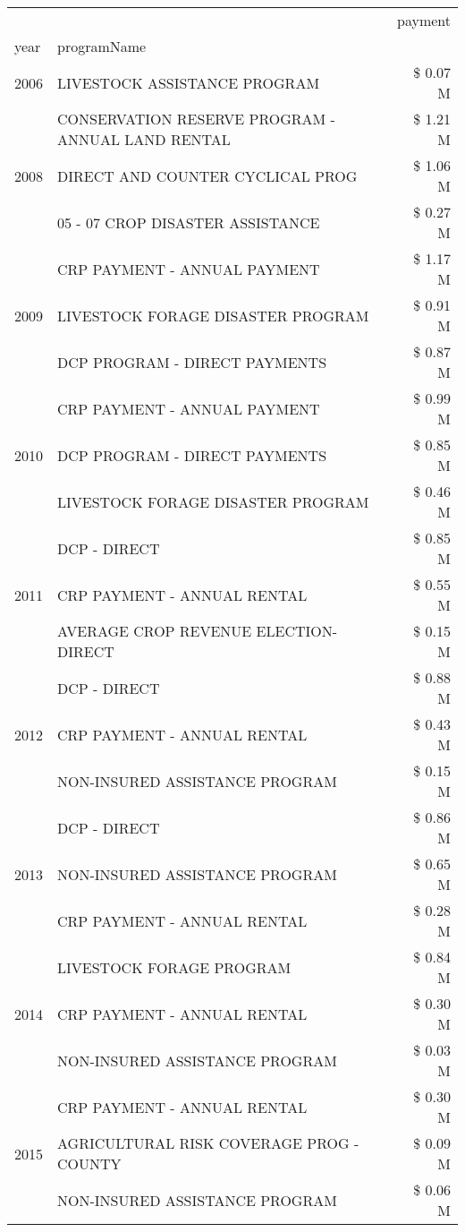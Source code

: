 \begin{tabular}{llr}
\toprule
 &  & payment \\
year & programName &  \\
\midrule
2006 & LIVESTOCK ASSISTANCE PROGRAM & \$ 0.07 M \\
\cline{1-3}
\multirow[t]{3}{*}{2008} & CONSERVATION RESERVE PROGRAM - ANNUAL LAND RENTAL & \$ 1.21 M \\
 & DIRECT AND COUNTER CYCLICAL PROG & \$ 1.06 M \\
 & 05 - 07 CROP DISASTER ASSISTANCE & \$ 0.27 M \\
\cline{1-3}
\multirow[t]{3}{*}{2009} & CRP PAYMENT - ANNUAL PAYMENT & \$ 1.17 M \\
 & LIVESTOCK FORAGE DISASTER  PROGRAM & \$ 0.91 M \\
 & DCP PROGRAM - DIRECT PAYMENTS & \$ 0.87 M \\
\cline{1-3}
\multirow[t]{3}{*}{2010} & CRP PAYMENT - ANNUAL PAYMENT & \$ 0.99 M \\
 & DCP PROGRAM - DIRECT PAYMENTS & \$ 0.85 M \\
 & LIVESTOCK FORAGE DISASTER  PROGRAM & \$ 0.46 M \\
\cline{1-3}
\multirow[t]{3}{*}{2011} & DCP - DIRECT & \$ 0.85 M \\
 & CRP PAYMENT - ANNUAL RENTAL & \$ 0.55 M \\
 & AVERAGE CROP REVENUE ELECTION-DIRECT & \$ 0.15 M \\
\cline{1-3}
\multirow[t]{3}{*}{2012} & DCP - DIRECT & \$ 0.88 M \\
 & CRP PAYMENT - ANNUAL RENTAL & \$ 0.43 M \\
 & NON-INSURED ASSISTANCE PROGRAM & \$ 0.15 M \\
\cline{1-3}
\multirow[t]{3}{*}{2013} & DCP - DIRECT & \$ 0.86 M \\
 & NON-INSURED ASSISTANCE PROGRAM & \$ 0.65 M \\
 & CRP PAYMENT - ANNUAL RENTAL & \$ 0.28 M \\
\cline{1-3}
\multirow[t]{3}{*}{2014} & LIVESTOCK FORAGE PROGRAM & \$ 0.84 M \\
 & CRP PAYMENT - ANNUAL RENTAL & \$ 0.30 M \\
 & NON-INSURED ASSISTANCE PROGRAM & \$ 0.03 M \\
\cline{1-3}
\multirow[t]{3}{*}{2015} & CRP PAYMENT - ANNUAL RENTAL & \$ 0.30 M \\
 & AGRICULTURAL RISK COVERAGE PROG - COUNTY & \$ 0.09 M \\
 & NON-INSURED ASSISTANCE PROGRAM & \$ 0.06 M \\

\end{tabular}
